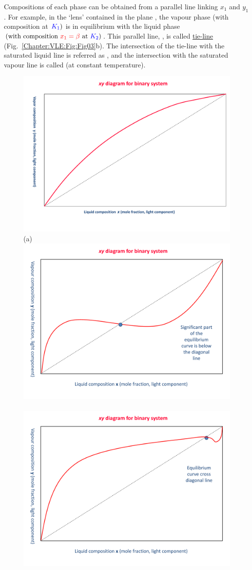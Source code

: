 Compositions of each phase can be obtained from a parallel line linking $x_{1}$ and $y_{1}$. For example, in the `lens'  contained in the plane , the vapour phase (with composition   at $\left.\textcolor{blue}{K_{1}}\right)$ is in equilibrium with the liquid phase $\left(\text{with composition }\textcolor{red}{x_{1}=\beta}\text{ at } \textcolor{blue}{K_{2}}\right)$. This parallel line, , is called \underline{tie-line} (Fig.~\ref{Chapter:VLE:Fig:Fig03}b). The intersection of the tie-line with the saturated liquid line is referred as , and the intersection with the saturated vapour line is called  (at constant temperature).
     \begin{figure}[h]
        \vbox{\hbox{\hspace{3.cm}\includegraphics[width=.6\linewidth,clip]{./../Pics/VLE_xy_DiagramIdeal}}
          \vspace{-.5cm}
          \hbox{\hspace{8.cm}(a)}
          \hbox{\hspace{-1.cm}\includegraphics[width=.5\linewidth,clip]{./../Pics/VLE_xy_DiagramNonIdeal1}
            \hspace{-0.cm}\includegraphics[width=.5\linewidth,clip]{./../Pics/VLE_xy_DiagramNonIdeal2}}
}
\end{figure}
